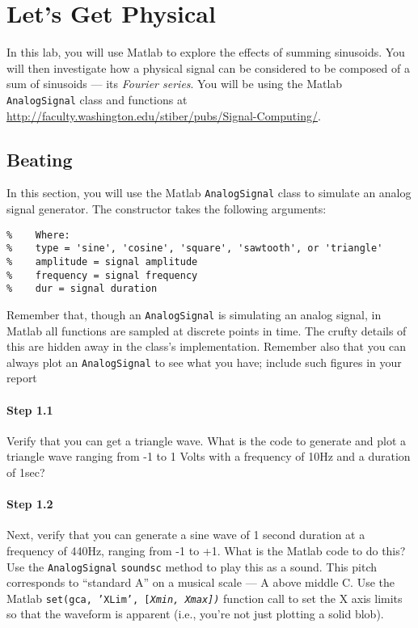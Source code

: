 
\section{Let's Get Physical}

In this lab, you will use Matlab to explore the effects of summing
sinusoids. You will then investigate how a physical signal can be
considered to be composed of a sum of sinusoids --- its \emph{Fourier
  series}. You will be using the Matlab \texttt{AnalogSignal} class
and functions at
\url{http://faculty.washington.edu/stiber/pubs/Signal-Computing/}.

\subsection{Beating}

In this section, you will use the Matlab \texttt{AnalogSignal} class
to simulate an analog signal generator. The constructor takes the
following arguments:
\begin{lstlisting}[style=Matlab-editor,basicstyle=\mlttfamily\small]
% AnalogSignal(type, amplitude, frequency, dur)
%    Where:
%    type = 'sine', 'cosine', 'square', 'sawtooth', or 'triangle'
%    amplitude = signal amplitude
%    frequency = signal frequency
%    dur = signal duration
\end{lstlisting}

Remember that, though an \texttt{AnalogSignal} is simulating an analog
signal, in Matlab all functions are sampled at discrete points in
time. The crufty details of this are hidden away in the class's
implementation. Remember also that you can always plot an
\texttt{AnalogSignal} to see what you have; include such figures in
your report 

\paragraph{Step 1.1} Verify that you can get a triangle wave. What is
the code to generate and plot a triangle wave ranging from -1 to 1
Volts with a frequency of 10Hz and a duration of 1sec?

\paragraph{Step 1.2} Next, verify that you can generate a sine wave of
1 second duration at a frequency of 440Hz, ranging from -1 to +1. What
is the Matlab code to do this? Use the \texttt{AnalogSignal}
\texttt{soundsc} method to play this as a sound. This pitch
corresponds to ``standard A'' on a musical scale --- A above middle
C. Use the Matlab \texttt{set(gca, 'XLim', [\itshape{Xmin},
  \itshape{Xmax}])} function call to set the X axis limits so that the
waveform is apparent (i.e., you're not just plotting a solid blob).

